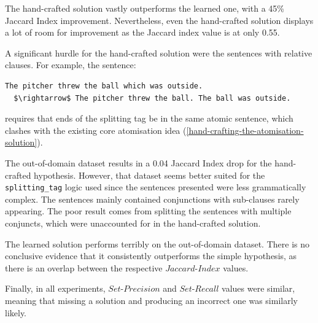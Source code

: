 The hand-crafted solution vastly outperforms the learned one, with a 45\% Jaccard Index improvement.
Nevertheless, even the hand-crafted solution displays a lot of room for improvement as the Jaccard index value is at only 0.55.

A significant hurdle for the hand-crafted solution were the sentences with relative clauses. 
For example, the sentence:
\begin{lstlisting}
The pitcher threw the ball which was outside. 
  $\rightarrow$ The pitcher threw the ball. The ball was outside.
\end{lstlisting}
requires that ends of the splitting tag be in the same atomic sentence, which clashes with the existing core atomisation idea (\ref{hand-crafting-the-atomisation-solution}).


The out-of-domain dataset results in a 0.04 Jaccard Index drop for the hand-crafted hypothesis.
However, that dataset seems better suited for the \verb+splitting_tag+ logic used since the sentences presented were less grammatically complex.
The sentences mainly contained conjunctions with sub-clauses rarely appearing.
The poor result comes from splitting the sentences with multiple conjuncts, which were unaccounted for in the hand-crafted solution.

The learned solution performs terribly on the out-of-domain dataset.
There is no conclusive evidence that it consistently outperforms the simple hypothesis, as there is an overlap between the respective $Jaccard$-$Index$ values.

Finally, in all experiments, $Set$-$Precision$ and $Set$-$Recall$ values were similar, meaning that missing a solution and producing an incorrect one was similarly likely.


